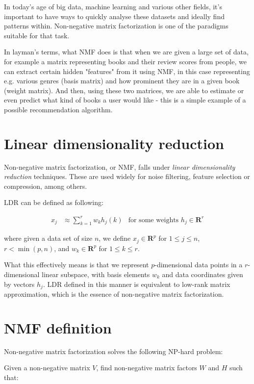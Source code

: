 In today's age of big data, machine learning and various other fields, it's important to have ways to quickly analyse these datasets and ideally find patterns within. Non-negative matrix factorization is one of the paradigms suitable for that task.

In layman's terms, what NMF does is that when we are given a large set of data, for example a matrix representing books and their review scores from people, we can extract certain hidden "features" from it using NMF, in this case representing e.g. various genres (basis matrix) and how prominent they are in a given book (weight matrix). And then, using these two matrices, we are able to estimate or even predict what kind of books a user would like - this is a simple example of a possible recommendation algorithm.

\section{Linear dimensionality reduction}
Non-negative matrix factorization, or NMF, falls under \emph{linear dimensionality reduction} techniques. These are used widely for noise filtering, feature selection or compression, among others.

LDR can be defined as following: \cite{nmf_why_how}

\begin{align}
x_j &\approx \sum_{k=1}^{r}w_kh_j(k) &\text{for some weights $h_j \in \mathbf{R}^r$}
\end{align}

where given a data set of size $n$, we define $x_j \in \mathbf{R}^p$ for $1 \leq j \leq n$, $r < \min(p,n)$, and $w_k \in \mathbf{R}^p$ for $1 \leq k \leq r$.

What this effectively means is that we represent $p$-dimensional data points in a $r$-dimensional linear subspace, with basis elements $w_k$ and data coordinates given by vectors $h_j$. LDR defined in this manner is equivalent to low-rank matrix approximation, which is the essence of non-negative matrix factorization.

\section{NMF definition}
Non-negative matrix factorization solves the following NP-hard \cite{wang_zhang_2013} problem:

Given a non-negative matrix $V$, find non-negative matrix factors $W$ and $H$ such that:

